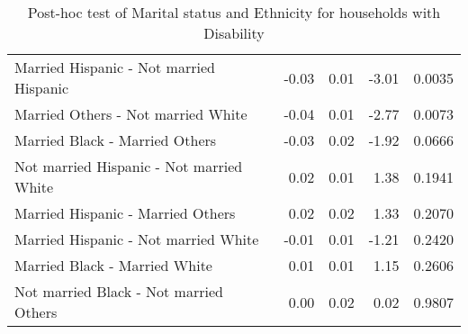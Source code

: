 \begin{table}[H]
\begin{tabular}{lrrrr}
    Married Hispanic -  Not married Hispanic & -0.03 & 0.01 & -3.01 & 0.0035 \\ 
    Married Others -  Not married White & -0.04 & 0.01 & -2.77 & 0.0073 \\ 
    Married Black -  Married Others & -0.03 & 0.02 & -1.92 & 0.0666 \\ 
    Not married Hispanic -  Not married White & 0.02 & 0.01 & 1.38 & 0.1941 \\ 
    Married Hispanic -  Married Others & 0.02 & 0.02 & 1.33 & 0.2070 \\ 
    Married Hispanic -  Not married White & -0.01 & 0.01 & -1.21 & 0.2420 \\ 
    Married Black -  Married White & 0.01 & 0.01 & 1.15 & 0.2606 \\ 
    Not married Black -  Not married Others & 0.00 & 0.02 & 0.02 & 0.9807 \\ 
   \hline
\end{tabular}
\caption{Post-hoc test of Marital status and Ethnicity for households with Disability} 
\label{tab:ms:race_originDisb}
\end{table}

